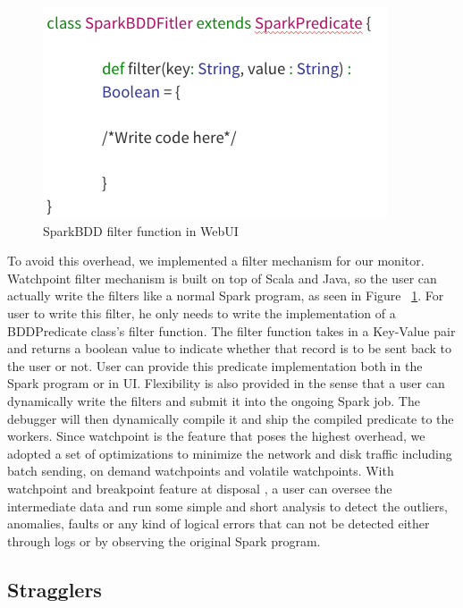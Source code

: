 \documentclass{acm_proc_article-sp}
\begin{document}
\begin{figure}[ht]
    \begin{minipage}[b]{\linewidth}
        \includegraphics[width=\textwidth]{predicate.png}
        \caption{SparkBDD filter function in WebUI}
        \label{fig:predicate}
    \end{minipage}
\end{figure}
To avoid this overhead, we implemented a filter mechanism for our monitor. Watchpoint filter mechanism is built on top of Scala and Java, so the user can actually write the filters like a normal Spark program, as seen in Figure ~\ref{fig:predicate}.  For user to write this filter, he only needs to write the implementation of a BDDPredicate class's filter function. The filter function takes in a Key-Value pair and returns a boolean value to indicate whether that record is to be sent back to the user or not. User can provide this predicate implementation both in the Spark program or in UI.  Flexibility is also provided in the sense that a user can dynamically write the filters and submit it into the ongoing Spark job. The debugger will then dynamically compile it and ship the compiled predicate to the workers. Since watchpoint is the feature that poses the highest overhead, we adopted a set of optimizations to minimize the network and disk traffic including batch sending, on demand watchpoints and volatile watchpoints. With watchpoint and breakpoint feature at disposal , a user can oversee the intermediate data and run some simple and short analysis to detect the outliers, anomalies, faults or any kind of logical errors that can not be detected either through logs or by observing the original Spark program. 

 
\subsection{Stragglers}
\end{document}
